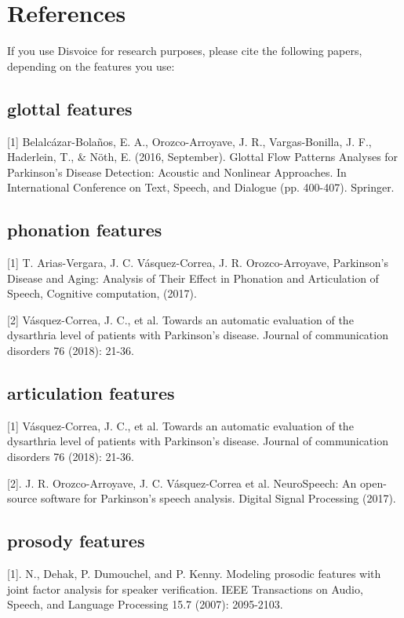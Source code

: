\documentclass[letterpaper,10pt,english]{sphinxmanual}
\begin{document}
\chapter{References}
\label{\detokenize{reference::doc}}\label{\detokenize{reference:references}}
If you use Disvoice for research purposes, please cite the following papers, depending on the features you use:


\section{glottal features}
\label{\detokenize{reference:glottal-features}}
{[}1{]} Belalcázar-Bolaños, E. A., Orozco-Arroyave, J. R., Vargas-Bonilla, J. F., Haderlein, T., \& Nöth, E. (2016, September). Glottal Flow Patterns Analyses for Parkinson’s Disease Detection: Acoustic and Nonlinear Approaches. In International Conference on Text, Speech, and Dialogue (pp. 400-407). Springer.


\section{phonation features}
\label{\detokenize{reference:phonation-features}}
{[}1{]} T. Arias-Vergara, J. C. Vásquez-Correa, J. R. Orozco-Arroyave, Parkinson's Disease and Aging: Analysis of Their Effect in Phonation and Articulation of Speech, Cognitive computation, (2017).

{[}2{]} Vásquez-Correa, J. C., et al. \sphinxquotedblleft{}Towards an automatic evaluation of the dysarthria level of patients with Parkinson's disease.\sphinxquotedblright{} Journal of communication disorders 76 (2018): 21-36.


\section{articulation features}
\label{\detokenize{reference:articulation-features}}
{[}1{]} Vásquez-Correa, J. C., et al. \sphinxquotedblleft{}Towards an automatic evaluation of the dysarthria level of patients with Parkinson's disease.\sphinxquotedblright{} Journal of communication disorders 76 (2018): 21-36.

{[}2{]}. J. R. Orozco-Arroyave, J. C. Vásquez-Correa et al. \sphinxquotedblleft{}NeuroSpeech: An open-source software for Parkinson's speech analysis.\sphinxquotedblright{} Digital Signal Processing (2017).


\section{prosody features}
\label{\detokenize{reference:prosody-features}}
{[}1{]}. N., Dehak, P. Dumouchel, and P. Kenny. \sphinxquotedblleft{}Modeling prosodic features with joint factor analysis for speaker verification.\sphinxquotedblright{} IEEE Transactions on Audio, Speech, and Language Processing 15.7 (2007): 2095-2103.
\end{document}
